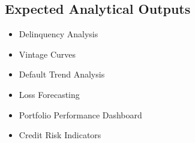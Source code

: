 \vspace{0.5cm}

\subsection*{Expected Analytical Outputs}

\begin{itemize}
	
	\item Delinquency Analysis
	
	\item Vintage Curves
	
	\item Default Trend Analysis
	
	\item Loss Forecasting
	
	\item Portfolio Performance Dashboard
	
	\item Credit Risk Indicators
	
\end{itemize}